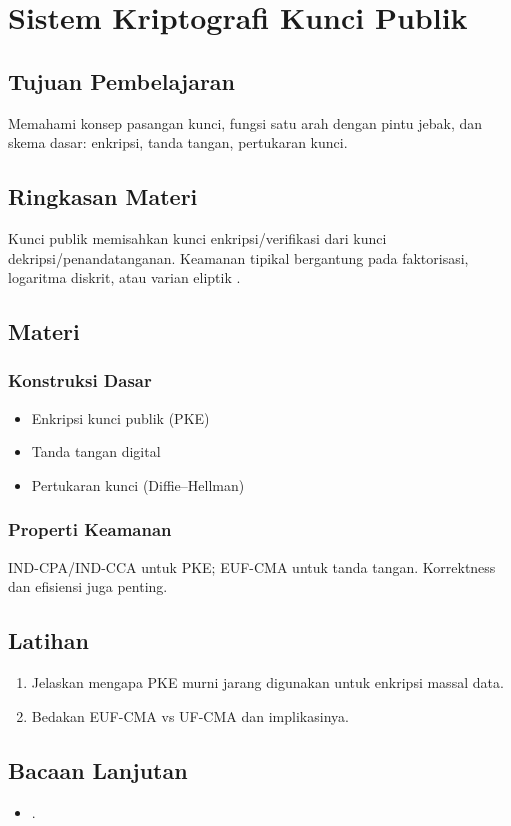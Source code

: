 \documentclass[../main.tex]{subfiles}
\begin{document}
\chapter{Sistem Kriptografi Kunci Publik}
\section{Tujuan Pembelajaran}
Memahami konsep pasangan kunci, fungsi satu arah dengan pintu jebak, dan skema dasar: enkripsi, tanda tangan, pertukaran kunci.

\section{Ringkasan Materi}
Kunci publik memisahkan kunci enkripsi/verifikasi dari kunci dekripsi/penandatanganan. Keamanan tipikal bergantung pada faktorisasi, logaritma diskrit, atau varian eliptik \citep{bonehshoup,hac}.

\section{Materi}
\subsection{Konstruksi Dasar}
\begin{itemize}
  \item Enkripsi kunci publik (PKE)
  \item Tanda tangan digital
  \item Pertukaran kunci (Diffie--Hellman)
\end{itemize}

\subsection{Properti Keamanan}
IND-CPA/IND-CCA untuk PKE; EUF-CMA untuk tanda tangan. Korrektness dan efisiensi juga penting.

\section{Latihan}
\begin{enumerate}
  \item Jelaskan mengapa PKE murni jarang digunakan untuk enkripsi massal data.
  \item Bedakan EUF-CMA vs UF-CMA dan implikasinya.
\end{enumerate}

\section{Bacaan Lanjutan}
\begin{itemize}
  \item \citep{bonehshoup,hac}.
\end{itemize}
\end{document}
